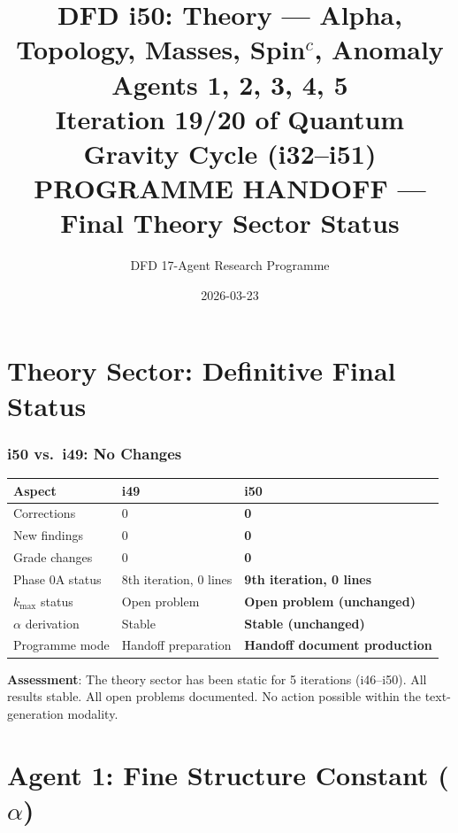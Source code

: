 \documentclass[11pt,a4paper]{article}
\title{DFD i50: Theory --- Alpha, Topology, Masses, Spin$^c$, Anomaly\\[6pt]
\large Agents 1, 2, 3, 4, 5\\[6pt]
\normalsize Iteration 19/20 of Quantum Gravity Cycle (i32--i51)\\[6pt]
\textbf{PROGRAMME HANDOFF --- Final Theory Sector Status}}
\author{DFD 17-Agent Research Programme}
\date{2026-03-23}
\begin{document}
\maketitle
\tableofcontents
\newpage

\part{Theory Sector: Definitive Final Status}
\label{part:overview}

\section{i50 vs.\ i49: No Changes}

\begin{center}
\begin{tabular}{lll}
\toprule
\textbf{Aspect} & \textbf{i49} & \textbf{i50} \\
\midrule
Corrections & 0 & \textbf{0} \\
New findings & 0 & \textbf{0} \\
Grade changes & 0 & \textbf{0} \\
Phase 0A status & 8th iteration, 0 lines & \textbf{9th iteration, 0 lines} \\
$k_{\max}$ status & Open problem & \textbf{Open problem (unchanged)} \\
$\alpha$ derivation & Stable & \textbf{Stable (unchanged)} \\
Programme mode & Handoff preparation & \textbf{Handoff document production} \\
\bottomrule
\end{tabular}
\end{center}

\textbf{Assessment}: The theory sector has been static for 5 iterations (i46--i50). All results stable. All open problems documented. No action possible within the text-generation modality.


\part{Agent 1: Fine Structure Constant ($\alpha$)}
\label{part:agent1}
\end{document}
